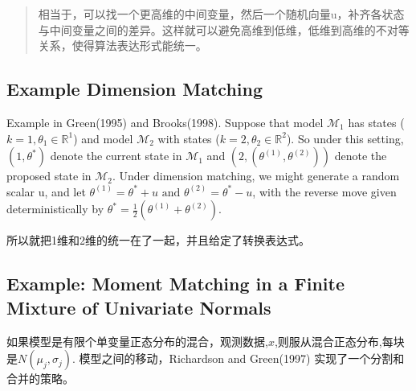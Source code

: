 \documentclass[
]{book}
\theoremstyle{definition}
\theoremstyle{definition}
\theoremstyle{definition}
\theoremstyle{remark}
\begin{document}
\begin{quote}
相当于，可以找一个更高维的中间变量，然后一个随机向量u，补齐各状态与中间变量之间的差异。这样就可以避免高维到低维，低维到高维的不对等关系，使得算法表达形式能统一。
\end{quote}

\hypertarget{example-dimension-matching}{%
\subsection{Example Dimension Matching}\label{example-dimension-matching}}

Example in Green(1995) and Brooks(1998). Suppose that model \(\mathcal M_1\) has states (\(k=1,\theta_1\in \mathbb R^1\)) and model \(\mathcal M_2\) with states (\(k=2,\theta_2\in \mathbb R^2\)). So under this setting, \((1,\theta^*)\) denote the current state in \(\mathcal M_1\) and \((2,(\theta^{(1)},\theta^{(2)}))\) denote the proposed state in \(\mathcal M_2\).
Under dimension matching, we might generate a random scalar u, and let \(\theta^{(1)}=\theta^{*}+u \text { and } \theta^{(2)}=\theta^{*}-u\), with the reverse move given deterministically by \(\theta^{*}=\frac{1}{2}\left(\theta^{(1)}+\theta^{(2)}\right)\).

所以就把1维和2维的统一在了一起，并且给定了转换表达式。

\hypertarget{example-moment-matching-in-a-finite-mixture-of-univariate-normals}{%
\subsection{Example: Moment Matching in a Finite Mixture of Univariate Normals}\label{example-moment-matching-in-a-finite-mixture-of-univariate-normals}}

如果模型是有限个单变量正态分布的混合，观测数据,\(x\),则服从混合正态分布,每块是\(N(\mu_j,\sigma_j)\). 模型之间的移动，Richardson and Green(1997) 实现了一个分割和合并的策略。
\end{document}
